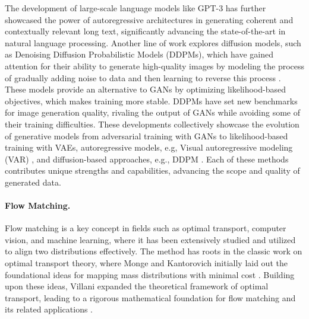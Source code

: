 The development of large-scale language models like GPT-3 \cite{brown2020language} has further showcased the power of autoregressive architectures in generating coherent and contextually relevant long text, significantly advancing the state-of-the-art in natural language processing. Another line of work explores diffusion models, such as Denoising Diffusion Probabilistic Models (DDPMs), which have gained attention for their ability to generate high-quality images by modeling the process of gradually adding noise to data and then learning to reverse this process \cite{ho2020denoising}. These models provide an alternative to GANs by optimizing likelihood-based objectives, which makes training more stable. DDPMs have set new benchmarks for image generation quality, rivaling the output of GANs while avoiding some of their training difficulties. These developments collectively showcase the evolution of generative models from adversarial training with GANs to likelihood-based training with VAEs, autoregressive models, e.g, Visual autoregressive modeling (VAR) \cite{tjy+24}, and diffusion-based approaches, e.g., DDPM \cite{ho2020denoising}. Each of these methods contributes unique strengths and capabilities, advancing the scope and quality of generated data.

\paragraph{Flow Matching.}
Flow matching \cite{dlt+24,ylp+24,gdb+24,cgl+25_homo} is a key concept in fields such as optimal transport, computer vision, and machine learning, where it has been extensively studied and utilized to align two distributions effectively. The method has roots in the classic work on optimal transport theory, where Monge and Kantorovich initially laid out the foundational ideas for mapping mass distributions with minimal cost \cite{monge1781memoire, kantorovich1942transfer}. Building upon these ideas, Villani expanded the theoretical framework of optimal transport, leading to a rigorous mathematical foundation for flow matching and its related applications \cite{villani2008optimal}. 

